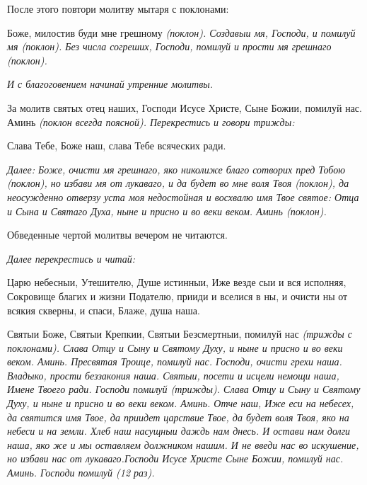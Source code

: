 После этого повтори молитву мытаря с поклонами:


Боже, милостив буди мне грешному \itshape (поклон)\normalfont{}. Создавыи мя, Господи, и помилуй мя \itshape (поклон)\normalfont{}. Без числа согреших, Господи, помилуй и прости мя грешнаго \itshape (поклон)\normalfont{}. 


\medskip


\itshape И с благоговением начинай утренние молитвы.\normalfont{}


\medskip


За молитв святых отец наших, Господи Исусе Христе, Сыне Божии, помилуй нас. Аминь \itshape (поклон всегда поясной). Перекрестись и говори трижды:\normalfont{}


Слава Тебе, Боже наш, слава Тебе всяческих ради. 


\medskip


\itshape Далее:\normalfont{} Боже, очисти мя грешнаго, яко николиже благо сотворих пред Тобою \itshape (поклон)\normalfont{}, но избави мя от лукаваго, и да будет во мне воля Твоя \itshape (поклон)\normalfont{}, да неосужденно отверзу уста моя недостойная и восхвалю имя Твое святое: Отца и Сына и Святаго Духа, ныне и присно и во веки веком. Аминь \itshape (поклон).

 Обведенные чертой молитвы вечером не читаются.\normalfont{} 


\medskip


\itshape Далее перекрестись и читай: \normalfont{}


Царю небесныи, Утешителю, Душе истинныи, Иже везде сыи и вся исполняя, Сокровище благих и жизни Подателю, прииди и вселися в ны, и очисти ны от всякия скверны, и спаси, Блаже, душа наша.


Святыи Боже, Святыи Крепкии, Святыи Безсмертныи, помилуй нас \itshape (трижды с поклонами)\normalfont{}. Слава Отцу и Сыну и Святому Духу, и ныне и присно и во веки веком. Аминь. Пресвятая Троице, помилуй нас. Господи, очисти грехи наша. Владыко, прости беззакония наша. Святыи, посети и исцели немощи наша, Имене Твоего ради. Господи помилуй (трижды). Слава Отцу и Сыну и Святому Духу, и ныне и присно и во веки веком. Аминь. Отче наш, Иже еси на небесех, да святится имя Твое, да приидет царствие Твое, да будет воля Твоя, яко на небеси и на земли. Хлеб наш насущныи даждь нам днесь. И остави нам долги наша, яко же и мы оставляем должником нашим. И не введи нас во искушение, но избави нас от лукаваго.Господи Исусе Христе Сыне Божии, помилуй нас. Аминь. Господи помилуй \itshape (12 раз)\normalfont{}. 


